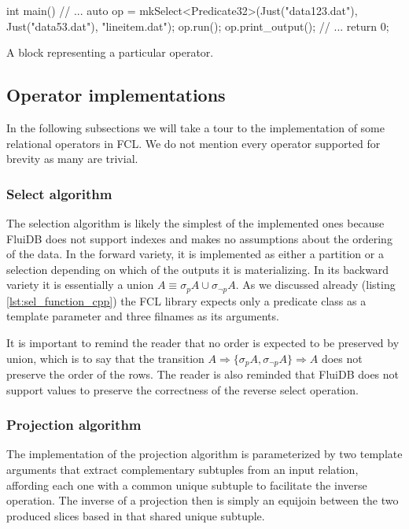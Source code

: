 \begin{code}
\begin{cppcode}
int main() {
  // ...
  {
    auto op = mkSelect<Predicate32>(Just("data123.dat"), Just("data53.dat"),
                                    "lineitem.dat");
    op.run();
    op.print_output();
  }
  // ...
  return 0;
}
\end{cppcode}
  \caption{\label{lst:gen_out_code}A block representing a particular
    operator.}
\end{code}


\subsection{Operator implementations}

In the following subsections we will take a tour to the implementation
of some relational operators in FCL. We do not mention every operator
supported for brevity as many are trivial.

\subsubsection{Select algorithm}

The selection algorithm is likely the simplest of the implemented ones
because FluiDB does not support indexes and makes no assumptions about
the ordering of the data. In the forward variety, it is implemented as
either a partition or a selection depending on which of the outputs it
is materializing. In its backward variety it is essentially a union
\(A \equiv \sigma_p A \cup \sigma_{\neg p} A\). As we discussed
already (listing \ref{lst:sel_function_cpp}) the FCL library expects
only a predicate class as a template parameter and three filnames as
its arguments.

It is important to remind the reader that no order is expected to be
preserved by union, which is to say that the transition \(A
\Rightarrow \{\sigma_p A, \sigma_{\neg p} A\} \Rightarrow A\) does not
preserve the order of the rows. The reader is also reminded that
FluiDB does not support  values to preserve the correctness of
the reverse select operation.


\subsubsection{Projection algorithm}
\label{sec:projection_algorithm}

The implementation of the projection algorithm is parameterized by two
template arguments that extract complementary subtuples from an input
relation, affording each one with a common unique subtuple to
facilitate the inverse operation. The inverse of a projection then is
simply an equijoin between the two produced slices based in that
shared unique subtuple.

